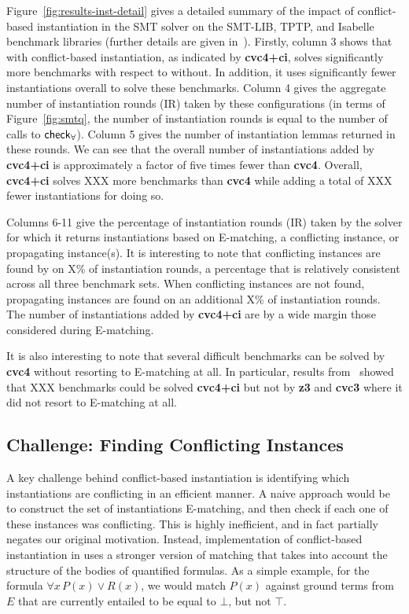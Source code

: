 \documentclass[oribibl]{llncs}
\begin{document}
Figure~\ref{fig:results-inst-detail}
gives a detailed summary of the impact of conflict-based instantiation in the SMT solver \cvc
on the SMT-LIB, TPTP, and Isabelle benchmark libraries (further details are given in~\cite{}).
Firstly, column 3 shows that \cvc with conflict-based instantiation, as indicated by {\bf cvc4+ci},
solves significantly more benchmarks with respect to \cvc without.
In addition, it uses significantly fewer instantiations overall to solve these benchmarks.
Column 4 gives the aggregate number of instantiation rounds (IR) taken by these configurations
(in terms of Figure~\ref{fig:smtq}, the number of instantiation rounds is equal to the number of calls to $\small\mathsf{check}_\forall$).
Column 5 gives the number of instantiation lemmas returned in these rounds.
We can see that the overall number of instantiations added by {\bf cvc4+ci} is approximately
a factor of five times fewer than {\bf cvc4}.
Overall, {\bf cvc4+ci} solves XXX more benchmarks than {\bf cvc4}
while adding a total of XXX fewer instantiations for doing so.

Columns 6-11 give the percentage of instantiation rounds (IR) taken by the solver 
for which it returns instantiations based on E-matching, a conflicting instance,
or propagating instance(s).
It is interesting to note that conflicting instances are found by \cvc on
X\% of instantiation rounds, a percentage that is relatively consistent across all three benchmark sets.
When conflicting instances are not found, propagating instances are found on an additional X\% of instantiation rounds.
The number of instantiations added by {\bf cvc4+ci} are by a wide margin those considered during E-matching.

It is also interesting to note that several difficult benchmarks can be solved by {\bf cvc4}
without resorting to E-matching at all.
In particular, results from~\cite{} showed that XXX benchmarks could be solved {\bf cvc4+ci}
but not by {\bf z3} and {\bf cvc3} where it did not resort to E-matching at all.

\subsection{Challenge: Finding Conflicting Instances}
A key challenge behind conflict-based instantiation
is identifying which instantiations are conflicting in an efficient manner.
A naive approach would be to construct the set of instantiations E-matching, and then check if each one of these instances
was conflicting.
This is highly inefficient, and in fact partially negates our original motivation.
Instead, implementation of conflict-based instantiation in \cvc uses a stronger version of matching
that takes into account the structure of the bodies of quantified formulas.
As a simple example, for the formula $\forall x\, P( x ) \vee R( x )$, we would match
$P( x )$ against ground terms from $E$ that are currently entailed to be equal to $\bot$, but not $\top$.
\end{document}
